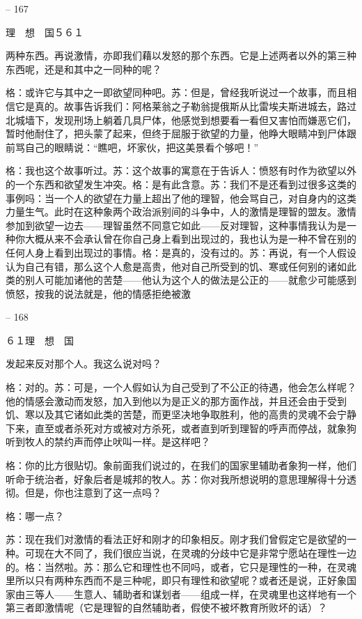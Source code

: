 \documentclass[11pt,oneside]{book}
\begin{document}
\begin{common-format}
    

-- 167

    理　想　国５６１

    两种东西。再说激情，亦即我们藉以发怒的那个东西。它是上述两者以外的第三种东西呢，还是和其中之一同种的呢？

    格：或许它与其中之一即欲望同种吧。苏：但是，曾经我听说过一个故事，而且相信它是真的。故事告诉我们：阿格莱翁之子勒翁提俄斯从比雷埃夫斯进城去，路过北城墙下，发现刑场上躺着几具尸体，他感觉到想要看一看但又害怕而嫌恶它们，暂时他耐住了，把头蒙了起来，但终于屈服于欲望的力量，他睁大眼睛冲到尸体跟前骂自己的眼睛说：“瞧吧，坏家伙，把这美景看个够吧！”

    格：我也这个故事听过。苏：这个故事的寓意在于告诉人：愤怒有时作为欲望以外的一个东西和欲望发生冲突。格：是有此含意。苏：我们不是还看到过很多这类的事例吗：当一个人的欲望在力量上超出了他的理智，他会骂自己，对自身内的这类力量生气。此时在这种象两个政治派别间的斗争中，人的激情是理智的盟友。激情参加到欲望一边去——理智虽然不同意它如此——反对理智，这种事情我认为是一种你大概从来不会承认曾在你自己身上看到出现过的，我也认为是一种不曾在别的任何人身上看到出现过的事情。格：是真的，没有过的。苏：再说，有一个人假设认为自己有错，那么这个人愈是高贵，他对自己所受到的饥、寒或任何别的诸如此类的别人可能加诸他的苦楚——他认为这个人的做法是公正的——就愈少可能感到愤怒，按我的说法就是，他的情感拒绝被激

    

-- 168

    ６１理　想　国

    发起来反对那个人。我这么说对吗？

    格：对的。苏：可是，一个人假如认为自己受到了不公正的待遇，他会怎么样呢？他的情感会激动而发怒，加入到他以为是正义的那方面作战，并且还会由于受到饥、寒以及其它诸如此类的苦楚，而更坚决地争取胜利，他的高贵的灵魂不会宁静下来，直至或者杀死对方或被对方杀死，或者直到听到理智的呼声而停战，就象狗听到牧人的禁约声而停止吠叫一样。是这样吧？

    格：你的比方很贴切。象前面我们说过的，在我们的国家里辅助者象狗一样，他们听命于统治者，好象后者是城邦的牧人。苏：你对我所想说明的意思理解得十分透彻。但是，你也注意到了这一点吗？

    格：哪一点？

    苏：现在我们对激情的看法正好和刚才的印象相反。刚才我们曾假定它是欲望的一种。可现在大不同了，我们很应当说，在灵魂的分歧中它是非常宁愿站在理性一边的。格：当然啦。苏：那么它和理性也不同吗，或者，它只是理性的一种，在灵魂里所以只有两种东西而不是三种呢，即只有理性和欲望呢？或者还是说，正好象国家由三等人——生意人、辅助者和谋划者——组成一样，在灵魂里也这样地有一个第三者即激情呢（它是理智的自然辅助者，假使不被坏教育所败坏的话）？


\end{common-format}
\end{document}
